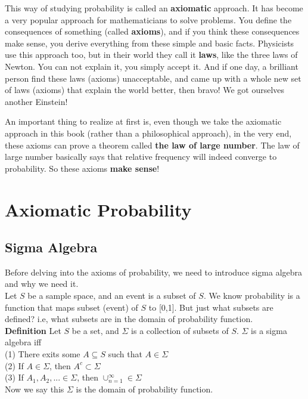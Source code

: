 \documentclass[a4paper,12pt]{article}
\begin{document}
This way of studying probability is called an \textbf{axiomatic} approach. It has become a very popular approach for mathematicians to solve problems. You define the consequences of something (called \textbf{axioms}), and if you think these consequences make sense, you derive everything from these simple and basic facts. Physicists use this approach too, but in their world they call it \textbf{laws}, like the three laws of Newton. You can not explain it, you simply accept it. And if one day, a brilliant person find these laws (axioms) unacceptable, and came up with a whole new set of laws (axioms) that explain the world better, then bravo! We got ourselves another Einstein!

An important thing to realize at first is, even though we take the axiomatic approach in this book (rather than a philosophical approach), in the very end, these axioms can prove a theorem called \textbf{the law of large number}. The law of large number basically says that relative frequency will indeed converge to probability. So these axioms \textbf{make sense}!

\newpage
\section{Axiomatic Probability}
\subsection{Sigma Algebra}
Before delving into the axioms of probability, we need to introduce sigma algebra and why we need it.\\

Let $S$ be a sample space, and an event is a subset of $S$. We know probability is a function that maps subset (event) of $S$ to [0,1]. But just what subsets are defined? i.e, what subsets are in the domain of probability function.\\

\textbf{Definition} Let $S$ be a set, and $\Sigma$ is a collection of subsets of $S$.  $\Sigma$ is a sigma algebra  iff\\
(1) There exits some $A \subseteq S$ such that $A\in\Sigma$\\
(2) If $A \in \Sigma$, then $A^c \subset \Sigma$\\
(3) If $A_1, A_2, ... \in \Sigma$, then $\cup_{n=1}^\infty \in \Sigma$\\

Now we say this $\Sigma$ is the domain of probability function.\\
\end{document}
